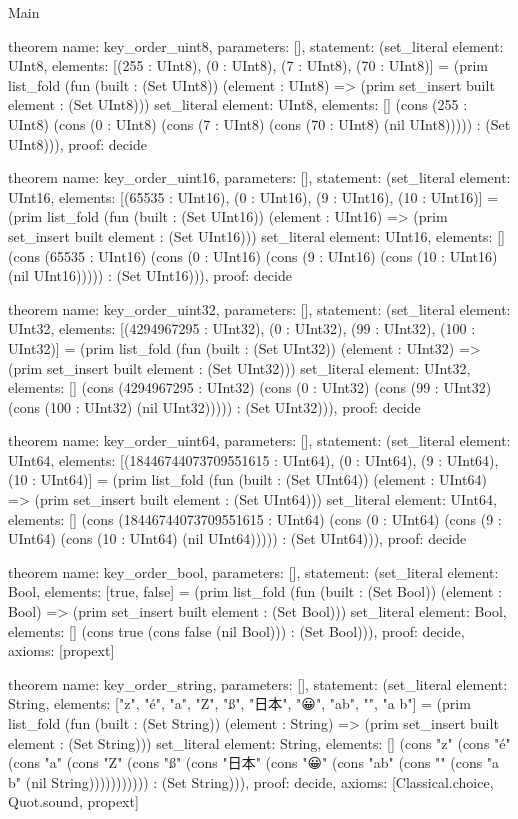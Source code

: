 \begin{lexlean}{Main}
\begin{semanticmodule}
theorem{
  name: key_order_uint8,
  parameters: [],
  statement: (set_literal{
    element: UInt8,
    elements: [(255 : UInt8), (0 : UInt8), (7 : UInt8), (70 : UInt8)]
  } = (prim list_fold (fun (built : (Set UInt8)) (element : UInt8) => (prim set_insert built element : (Set UInt8))) set_literal{
    element: UInt8,
    elements: []
  } (cons (255 : UInt8) (cons (0 : UInt8) (cons (7 : UInt8) (cons (70 : UInt8) (nil UInt8))))) : (Set UInt8))),
  proof: decide{}
}

theorem{
  name: key_order_uint16,
  parameters: [],
  statement: (set_literal{
    element: UInt16,
    elements: [(65535 : UInt16), (0 : UInt16), (9 : UInt16), (10 : UInt16)]
  } = (prim list_fold (fun (built : (Set UInt16)) (element : UInt16) => (prim set_insert built element : (Set UInt16))) set_literal{
    element: UInt16,
    elements: []
  } (cons (65535 : UInt16) (cons (0 : UInt16) (cons (9 : UInt16) (cons (10 : UInt16) (nil UInt16))))) : (Set UInt16))),
  proof: decide{}
}

theorem{
  name: key_order_uint32,
  parameters: [],
  statement: (set_literal{
    element: UInt32,
    elements: [(4294967295 : UInt32), (0 : UInt32), (99 : UInt32), (100 : UInt32)]
  } = (prim list_fold (fun (built : (Set UInt32)) (element : UInt32) => (prim set_insert built element : (Set UInt32))) set_literal{
    element: UInt32,
    elements: []
  } (cons (4294967295 : UInt32) (cons (0 : UInt32) (cons (99 : UInt32) (cons (100 : UInt32) (nil UInt32))))) : (Set UInt32))),
  proof: decide{}
}

theorem{
  name: key_order_uint64,
  parameters: [],
  statement: (set_literal{
    element: UInt64,
    elements: [(18446744073709551615 : UInt64), (0 : UInt64), (9 : UInt64), (10 : UInt64)]
  } = (prim list_fold (fun (built : (Set UInt64)) (element : UInt64) => (prim set_insert built element : (Set UInt64))) set_literal{
    element: UInt64,
    elements: []
  } (cons (18446744073709551615 : UInt64) (cons (0 : UInt64) (cons (9 : UInt64) (cons (10 : UInt64) (nil UInt64))))) : (Set UInt64))),
  proof: decide{}
}

theorem{
  name: key_order_bool,
  parameters: [],
  statement: (set_literal{
    element: Bool,
    elements: [true, false]
  } = (prim list_fold (fun (built : (Set Bool)) (element : Bool) => (prim set_insert built element : (Set Bool))) set_literal{
    element: Bool,
    elements: []
  } (cons true (cons false (nil Bool))) : (Set Bool))),
  proof: decide{},
  axioms: [propext]
}

theorem{
  name: key_order_string,
  parameters: [],
  statement: (set_literal{
    element: String,
    elements: ["z", "é", "a", "Z", "ß", "日本", "😀", "ab", "", "a b"]
  } = (prim list_fold (fun (built : (Set String)) (element : String) => (prim set_insert built element : (Set String))) set_literal{
    element: String,
    elements: []
  } (cons "z" (cons "é" (cons "a" (cons "Z" (cons "ß" (cons "日本" (cons "😀" (cons "ab" (cons "" (cons "a b" (nil String))))))))))) : (Set String))),
  proof: decide{},
  axioms: [Classical.choice, Quot.sound, propext]
}


\end{semanticmodule}
\end{lexlean}
